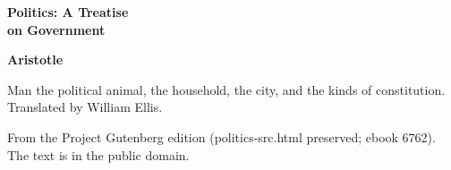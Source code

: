 \documentclass[11pt,letterpaper]{article}
\begin{document}
\color{ink}

\begin{titlepage}
\centering
\vspace*{4em}
{\LARGE\bfseries\color{heading} Politics: A Treatise\\[0.3em]on Government\par}
\vspace{2em}
{\Large\bfseries\color{heading} Aristotle\par}
\vspace{2.5em}
{\itshape\color{subhead}\parbox{0.8\linewidth}{\centering Man the political animal, the household, the city, and the kinds of constitution. Translated by William Ellis.\par}}
\vfill
{\small From the Project Gutenberg edition (politics-src.html preserved; ebook 6762). The text is in the public domain.\par}
\vspace{2em}
\end{titlepage}

\tableofcontents


\end{document}

